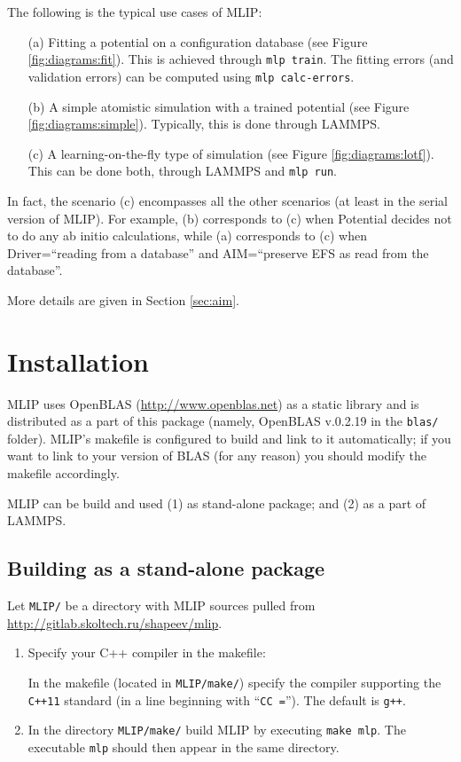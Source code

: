 \documentclass[12pt]{article}
\renewcommand{\_}{\char`_}
\begin{document}
The following is the typical use cases of MLIP:
\begin{itemize}
\item[(a)]
Fitting a potential on a configuration database (see Figure \ref{fig:diagrams:fit}).
This is achieved through \texttt{mlp train}.
The fitting errors (and validation errors) can be computed using \texttt{mlp calc-errors}.

\item[(b)]
A simple atomistic simulation with a trained potential (see Figure \ref{fig:diagrams:simple}).
Typically, this is done through LAMMPS.

\item[(c)]
A learning-on-the-fly type of simulation (see Figure \ref{fig:diagrams:lotf}).
This can be done both, through LAMMPS and \texttt{mlp run}.
\end{itemize}

In fact, the scenario (c) encompasses all the other scenarios (at least in the serial version of MLIP).
For example, (b) corresponds to (c) when Potential decides not to do any ab initio calculations, while (a) corresponds to (c) when Driver=``reading from a database'' and AIM=``preserve EFS as read from the database''.

More details are given in Section \ref{sec:aim}.

\section{Installation} \label{sec:install}

MLIP uses OpenBLAS (\url{http://www.openblas.net}) as a static library and is distributed as a part of this package (namely, OpenBLAS v.0.2.19 in the \texttt{blas/} folder). MLIP's makefile is configured to build and link to it automatically; if you want to link to your version of BLAS (for any reason) you should modify the makefile accordingly. 

MLIP can be build and used (1) as stand-alone package; and (2) as a part of LAMMPS. 


\subsection{Building as a stand-alone package}\label{sec:install:mlp} 

Let \texttt{MLIP/} be a directory with MLIP sources pulled from \url{http://gitlab.skoltech.ru/shapeev/mlip}. 

\begin{enumerate}
	\item Specify your C++ compiler in the makefile:
	
		\subitem In the makefile (located in \texttt{MLIP/make/}) specify the compiler supporting the \texttt{C++11} standard (in a line beginning with ``\texttt{CC =}''). The default is \texttt{g++}.
	
	\item In the directory \texttt{MLIP/make/} build MLIP by executing \texttt{make mlp}.
	The executable \texttt{mlp} should then appear in the same directory.
\end{enumerate}
\end{document}
